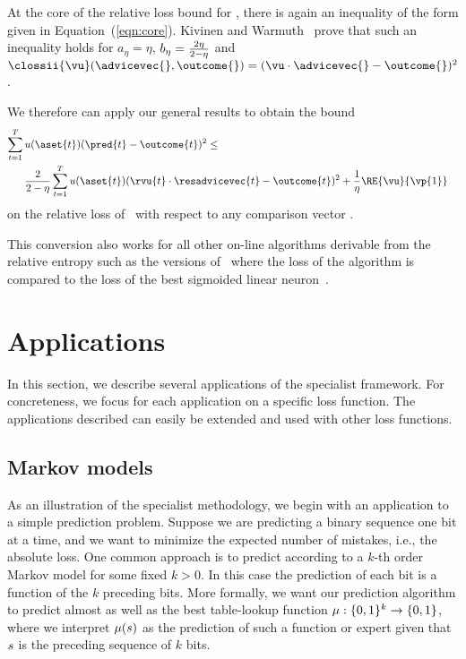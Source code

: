 At the core of the relative loss bound for \EG, there is again an inequality of
the form given in Equation~(\ref{eqn:core}).
Kivinen and Warmuth~\cite[Lemma~5.8]{KivinenWa95} prove that such an
inequality holds for $a_\eta=\eta$, $b_\eta = {2 \eta \over 2 - \eta}$
and $\clossii{\vu}(\advicevec{},\outcome{})=
(\vu\cdot \advicevec{}-\outcome{})^2$.
\iffalse
prove the following inequality:
\[
\RE{\vu}{\vp{t}} - \RE{\vu}{\vp{t+1}}
\geq
\eta\; (\pred{t}-\outcome{t})^2
-\frac{2\eta}{2-\eta}\; 
(\vu\cdot \advicevec{t}-\outcome{t})^2.
\]
As this is of the form given in Equation~(\ref{eqn:core})
(with
$\closs{\vu}(\advicevec{},\outcome{}) = (\vu\cdot
\advicevec{}-\outcome{})^2$),
\fi
We therefore can apply our general results to obtain the bound
\begin{eqnarray*}
\sum_{t=1}^T 
\lefteqn{u(\aset{t})(\pred{t}-\outcome{t})^2 \leq} \\
& \frac{2}{2-\eta}
\sum_{t=1}^T 
u(\aset{t})(\rvu{t}\cdot\resadvicevec{t}-\outcome{t})^2
+
\frac{1}{\eta} \RE{\vu}{\vp{1}}
\end{eqnarray*}
on the relative loss of \SEG\ with respect to any comparison vector
\vu. 

This conversion also works for all other on-line algorithms
derivable from the relative entropy such as the versions
of \EG\ where the loss of the algorithm is compared to the
loss of the best sigmoided linear neuron~\cite{HelmboldKiWa95}.

\section{Applications}

In this section, we describe several applications of the specialist
framework. For concreteness, we focus for each application on a
specific loss function. The applications described can easily be
extended and used with other loss functions.

\subsection{Markov models}
\label{sec:markov}

As an illustration of the specialist methodology, we begin with an
application to a simple prediction problem.
Suppose we are predicting a binary sequence one bit at a time, and we
want to minimize the expected number of mistakes, i.e., the absolute loss.
One common approach is to predict according to a $k$-th order Markov
model for some fixed $k>0$. 
In this case the prediction of each bit is a function of the $k$ preceding
bits.
More formally, we want our prediction algorithm 
to predict almost as well as the best
table-lookup function $\mu:\{0,1\}^k \rightarrow \{0,1\}$, where we
interpret $\mu(s)$ as the prediction of such a function or
expert given that $s$ is the preceding sequence of $k$ bits.


